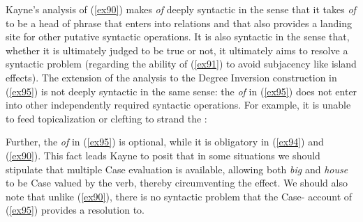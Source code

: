 \documentclass[output=paper,
modfonts
]{LSP/langsci}
\begin{document}
Kayne's analysis of ({\ref{ex90}}) makes {\textit{of}} deeply syntactic in the sense that it takes {\textit{of}} to be a head of phrase that enters into  relations and that also provides a landing site for other putative syntactic operations.  It is also syntactic in the sense that, whether it is ultimately judged to be true or not, it ultimately aims to resolve a syntactic problem (regarding the ability of ({\ref{ex91}}) to avoid subjacency like island effects).   The extension of the analysis to the Degree Inversion construction in ({\ref{ex95}}) is not deeply syntactic in the same sense:  the {\textit{of}} in ({\ref{ex95}}) does not enter into other independently required syntactic operations.  For example, it is unable to feed topicalization or clefting to strand the :

\begin{exe}
\ex\label{ex98} 
\begin{xlist}
\end{xlist}
\end{exe}
Further, the {\textit{of}} in ({\ref{ex95}}) is optional, while it is obligatory in ({\ref{ex94}}) and ({\ref{ex90}}).  This fact leads Kayne to posit that in some situations we should stipulate that multiple Case evaluation is available, allowing both {\textit{big}} and {\textit{house}} to be Case valued by the verb, thereby circumventing the  effect.  We should also note that unlike ({\ref{ex90}}), there is no syntactic problem that the Case- account of ({\ref{ex95}}) provides a resolution to.  
\end{document}
